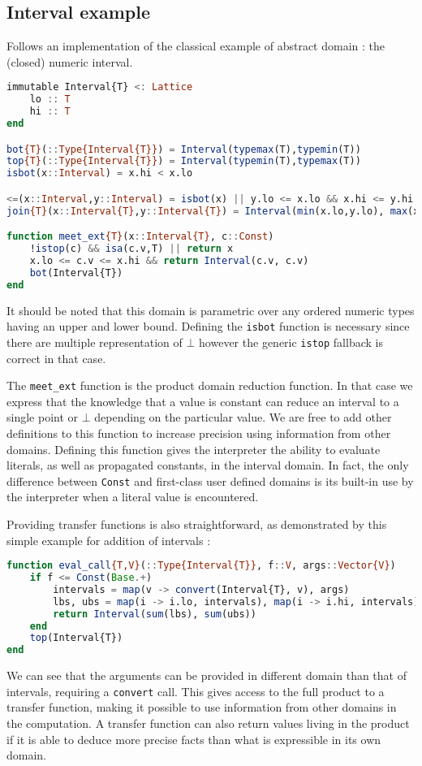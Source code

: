 \documentclass[11pt]{article}
\begin{document}
\subsection*{Interval example}
Follows an implementation of the classical example of abstract domain : the (closed) numeric interval.
\begin{singlespace}
\begin{lstlisting}[language=julia]
immutable Interval{T} <: Lattice
    lo :: T
    hi :: T
end

bot{T}(::Type{Interval{T}}) = Interval(typemax(T),typemin(T))
top{T}(::Type{Interval{T}}) = Interval(typemin(T),typemax(T))
isbot(x::Interval) = x.hi < x.lo

<=(x::Interval,y::Interval) = isbot(x) || y.lo <= x.lo && x.hi <= y.hi
join{T}(x::Interval{T},y::Interval{T}) = Interval(min(x.lo,y.lo), max(x.hi,y.hi))

function meet_ext{T}(x::Interval{T}, c::Const)
    !istop(c) && isa(c.v,T) || return x
    x.lo <= c.v <= x.hi && return Interval(c.v, c.v)
    bot(Interval{T})
end
\end{lstlisting}
\end{singlespace}
It should be noted that this domain is parametric over any ordered numeric types having an upper and lower bound. Defining the \verb~isbot~ function is necessary since there are multiple representation of $\bot$ however the generic \verb~istop~ fallback is correct in that case.

The \verb~meet_ext~ function is the product domain reduction function. In that case we express that the knowledge that a value is constant can reduce an interval to a single point or $\bot$ depending on the particular value. We are free to add other definitions to this function to increase precision using information from other domains.
Defining this function gives the interpreter the ability to evaluate literals, as well as propagated constants, in the interval domain. In fact, the only difference between \verb~Const~ and first-class user defined domains is its built-in use by the interpreter when a literal value is encountered. 

Providing transfer functions is also straightforward, as demonstrated by this simple example for addition of intervals :
\begin{singlespace}
\begin{lstlisting}[language=julia]
function eval_call{T,V}(::Type{Interval{T}}, f::V, args::Vector{V})
    if f <= Const(Base.+)
        intervals = map(v -> convert(Interval{T}, v), args)
        lbs, ubs = map(i -> i.lo, intervals), map(i -> i.hi, intervals)
        return Interval(sum(lbs), sum(ubs))
    end
    top(Interval{T})
end
\end{lstlisting}
\end{singlespace}
We can see that the arguments can be provided in different domain than that of intervals, requiring a \verb~convert~ call. This gives access to the full product to a transfer function, making it possible to use information from other domains in the computation. A transfer function can also return values living in the product if it is able to deduce more precise facts than what is expressible in its own domain.
\end{document}
